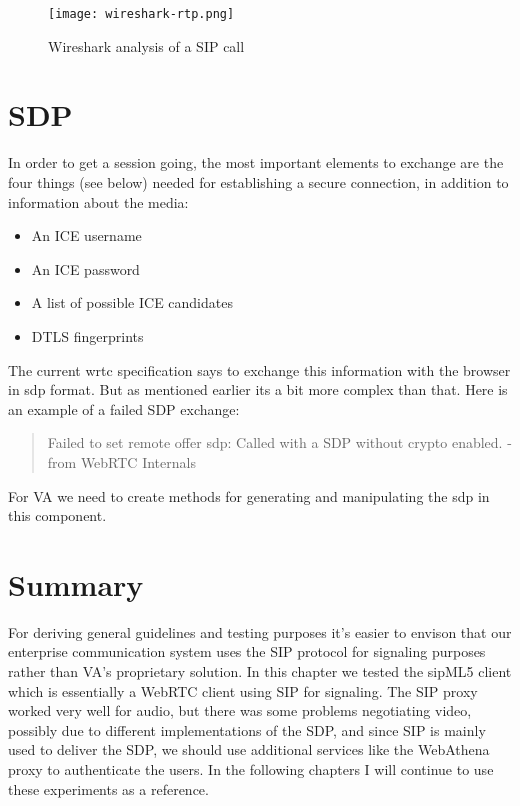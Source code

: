 \begin{figure}[here]
\centerline{\texttt{[image: wireshark-rtp.png]}}
\caption{Wireshark analysis of a SIP call}
\label{fig:wireshark-sip-call}
\end{figure}

\section{SDP}
In order to get a session going, the most important elements to exchange are the four things (see below) needed for establishing a secure connection, in addition to information about the media:

\begin{itemize}
\item{An ICE username}
\item{An ICE password}
\item{A list of possible ICE candidates}
\item{DTLS fingerprint}s
\end{itemize}

The current \gls{wrtc} specification says to exchange this information with the browser in \gls{sdp} format. But as mentioned earlier its a bit more complex than that. Here is an example of a failed SDP exchange:

\begin{quote}
Failed to set remote offer sdp: Called with a SDP without crypto enabled. -from WebRTC Internals
\end{quote}

For VA we need to create methods for generating and manipulating the \gls{sdp} in this component.

\section{Summary}
For deriving general guidelines and testing purposes it's easier to envison that our enterprise communication system uses the SIP protocol for signaling purposes rather than VA's proprietary solution. In this chapter we tested the sipML5 client which is essentially a WebRTC client using SIP for signaling. The SIP proxy worked very well for audio, but there was some problems negotiating video, possibly due to different implementations of the SDP, and since SIP is mainly used to deliver the SDP, we should use additional services like the WebAthena proxy to authenticate the users. In the following chapters I will continue to use these experiments as a reference.